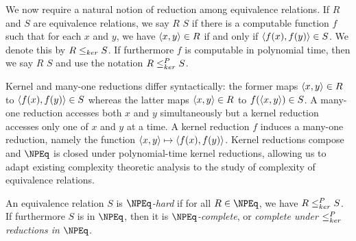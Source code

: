 We now require a natural notion of reduction among equivalence relations.
If $R$ and $S$ are equivalence relations, we say $R$  $S$ if there is a computable function $f$ such that for each $x$ and $y$, we have $\langle x,y\rangle \in R$ if and only if $\langle f(x),f(y)\rangle \in S$.
We denote this by $R \leq_{ker} S$.
If furthermore $f$ is computable in polynomial time, then we say $R$  $S$ and use the notation $R \leq^{P}_{ker} S$.

Kernel and many-one reductions differ syntactically: the former maps $\langle x,y\rangle\in R$ to $\langle f(x),f(y)\rangle\in S$ whereas the latter maps $\langle x,y\rangle\in R$ to $f(\langle x,y\rangle)\in S$.
A many-one reduction accesses both $x$ and $y$ simultaneously but a kernel reduction accesses only one of $x$ and $y$ at a time.
A kernel reduction $f$ induces a many-one reduction, namely the function $\langle x,y\rangle \mapsto \langle f(x),f(y)\rangle$.
Kernel reductions compose and $\NPEq$ is closed under polynomial-time kernel reductions, allowing us to adapt existing complexity theoretic analysis to the study of complexity of equivalence relations.

An equivalence relation $S$ is \emph{$\NPEq$-hard} if for all $R \in \NPEq$, we have $R \leq^{P}_{ker} S$.
If furthermore $S$ is in $\NPEq$, then it is \emph{$\NPEq$-complete}, or \emph{complete under $\leq^{P}_{ker}$ reductions in $\NPEq$}.
